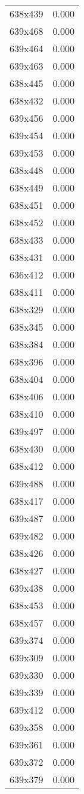 \begin{table}
\begin{tabular}{lr}
638x439 & 0.000 \\
639x468 & 0.000 \\
639x464 & 0.000 \\
639x463 & 0.000 \\
638x445 & 0.000 \\
638x432 & 0.000 \\
639x456 & 0.000 \\
639x454 & 0.000 \\
639x453 & 0.000 \\
638x448 & 0.000 \\
638x449 & 0.000 \\
638x451 & 0.000 \\
638x452 & 0.000 \\
638x433 & 0.000 \\
638x431 & 0.000 \\
636x412 & 0.000 \\
638x411 & 0.000 \\
638x329 & 0.000 \\
638x345 & 0.000 \\
638x384 & 0.000 \\
638x396 & 0.000 \\
638x404 & 0.000 \\
638x406 & 0.000 \\
638x410 & 0.000 \\
639x497 & 0.000 \\
638x430 & 0.000 \\
638x412 & 0.000 \\
639x488 & 0.000 \\
638x417 & 0.000 \\
639x487 & 0.000 \\
639x482 & 0.000 \\
638x426 & 0.000 \\
638x427 & 0.000 \\
639x438 & 0.000 \\
638x453 & 0.000 \\
638x457 & 0.000 \\
639x374 & 0.000 \\
639x309 & 0.000 \\
639x330 & 0.000 \\
639x339 & 0.000 \\
639x412 & 0.000 \\
639x358 & 0.000 \\
639x361 & 0.000 \\
639x372 & 0.000 \\
639x379 & 0.000 \\

\end{tabular}
\end{table}
